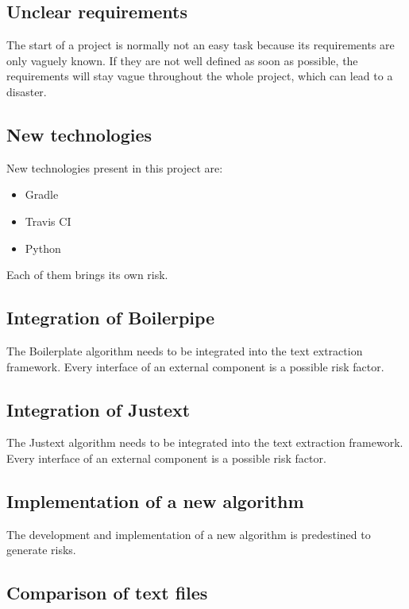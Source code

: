 \subsection{Unclear requirements}

The start of a project is normally not an easy task because its requirements are only vaguely known. If they are not well defined as soon as possible, the requirements will stay vague throughout the whole project, which can lead to a disaster. 

\subsection{New technologies}

New technologies present in this project are:

 \begin{itemize}
    \item Gradle
    \item Travis CI
    \item Python
\end{itemize}

Each of them brings its own risk.

\subsection{Integration of Boilerpipe}

The Boilerplate algorithm needs to be integrated into the text extraction framework. Every interface of an external component is a possible risk factor.

\subsection{Integration of Justext}


The Justext algorithm needs to be integrated into the text extraction framework. Every interface of an external component is a possible risk factor.


\subsection{Implementation of a new algorithm}

The development and implementation of a new algorithm is predestined to generate risks.

\subsection{Comparison of text files}

